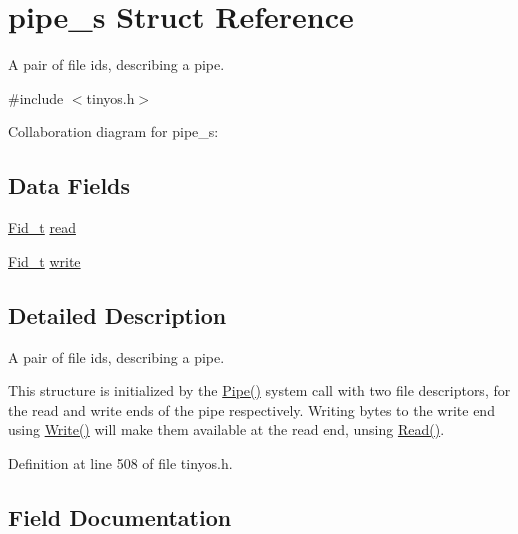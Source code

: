 \hypertarget{structpipe__s}{}\section{pipe\+\_\+s Struct Reference}
\label{structpipe__s}


A pair of file ids, describing a pipe.  




{\ttfamily \#include $<$tinyos.\+h$>$}



Collaboration diagram for pipe\+\_\+s\+:
\subsection*{Data Fields}
\begin{DoxyCompactItemize}
\item 
\hyperlink{group__syscalls_ga5097222c5f0da97d92d4712359abc38f}{Fid\+\_\+t} \hyperlink{structpipe__s_ad0839b4f9b1fdb0241411952203f18aa}{read}
\item 
\hyperlink{group__syscalls_ga5097222c5f0da97d92d4712359abc38f}{Fid\+\_\+t} \hyperlink{structpipe__s_a69acc9cdf5f10195c43491e3ffa98cb1}{write}
\end{DoxyCompactItemize}


\subsection{Detailed Description}
A pair of file ids, describing a pipe. 

This structure is initialized by the {\ttfamily \hyperlink{group__syscalls_gab6355ce54e047c31538ed5ed9108b5b3}{Pipe()}} system call with two file descriptors, for the read and write ends of the pipe respectively. Writing bytes to the write end using {\ttfamily \hyperlink{group__syscalls_gaf046f003fde24f79fb395c250137856c}{Write()}} will make them available at the read end, unsing {\ttfamily \hyperlink{group__syscalls_ga3e9dc545a789eb45b2d356eabbac3ee3}{Read()}}. 

Definition at line 508 of file tinyos.\+h.



\subsection{Field Documentation}
\mbox{\label{structpipe__s_ad0839b4f9b1fdb0241411952203f18aa}} 
